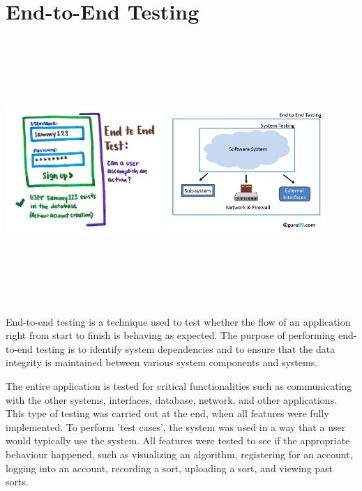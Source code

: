 \section{End-to-End Testing}
\begin{center}
    \includegraphics[width=6cm,height=10cm,keepaspectratio]{images/e2e_1}
    \includegraphics[width=6cm,height=10cm,keepaspectratio]{images/e2e_2}
\end{center}

End-to-end testing is a technique used to test whether the flow of an 
application right from start to finish is behaving as expected. The purpose of 
performing end-to-end testing is to identify system dependencies and to ensure
that the data integrity is maintained between various system components and 
systems.
\par
\bigskip
The entire application is tested for critical functionalities such as 
communicating with the other systems, interfaces, database, network, and other 
applications. This type of testing was carried out at the end, when all features were fully implemented. To perform 'test cases', the system was used in a way that a user would typically use the system. All features were tested to see if the appropriate behaviour happened, such as visualizing an algorithm, registering for an account, logging into an account, recording a sort, uploading a sort, and viewing past sorts.

